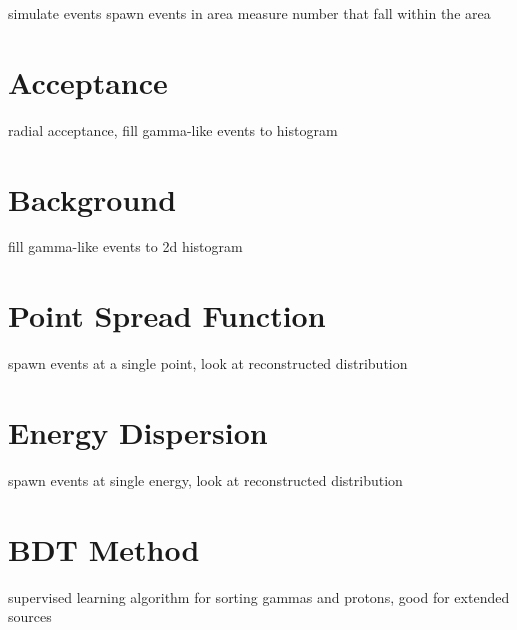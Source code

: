 simulate events
spawn events in area
measure number that fall within the area

\section{Acceptance}
radial acceptance, fill gamma-like events to histogram

\section{Background}
fill gamma-like events to 2d histogram

\section{Point Spread Function}
spawn events at a single point, look at reconstructed distribution

\section{Energy Dispersion}
spawn events at single energy, look at reconstructed distribution

\section{BDT Method}
supervised learning algorithm for sorting gammas and protons, good for extended sources

